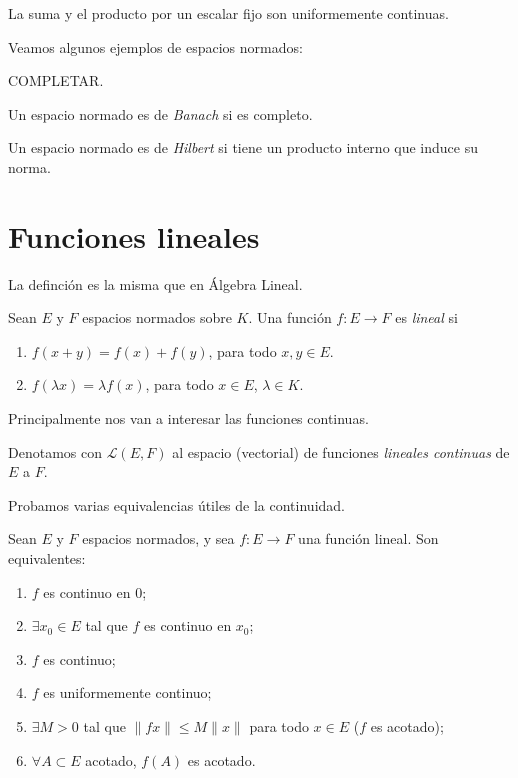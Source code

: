 \begin{remark}
	La suma y el producto por un escalar fijo son uniformemente continuas.
\end{remark}

Veamos algunos ejemplos de espacios normados:

\begin{example}
	\color{red} COMPLETAR.
\end{example}

\begin{definition}
	Un espacio normado es de \emph{Banach} si es completo.
\end{definition}

\begin{definition}
	Un espacio normado es de \emph{Hilbert} si tiene un producto interno que induce su norma.
\end{definition}


\section{Funciones lineales}

La definción es la misma que en Álgebra Lineal.

\begin{definition}
	Sean $E$ y $F$ espacios normados sobre $K$. Una función $f : E \to F$ es \emph{lineal} si
	\begin{enumerate}
		\item $f(x + y) = f(x) + f(y)$, para todo $x, y \in E$.
		\item $f(\lambda x) = \lambda f(x)$, para todo $x \in E$, $\lambda \in K$.
	\end{enumerate}
\end{definition}

Principalmente nos van a interesar las funciones continuas.

\begin{definition}
	Denotamos con $\mathcal{L}(E, F)$ al espacio (vectorial) de funciones \emph{lineales continuas} de $E$ a $F$.
\end{definition}

Probamos varias equivalencias útiles de la continuidad.

\begin{proposition}
	Sean $E$ y $F$ espacios normados, y sea $f : E \to F$ una función lineal. Son equivalentes:
	\begin{enumerate}
		\item $f$ es continuo en $0$;
		\item $\exists x_0 \in E$ tal que $f$ es continuo en $x_0$;
		\item $f$ es continuo;
		\item $f$ es uniformemente continuo;
		\item $\exists M > 0$ tal que $\|fx\| \le M\|x\|$ para todo $x \in E$ ($f$ es acotado);
		\item $\forall A \subset E$ acotado, $f(A)$ es acotado.
	\end{enumerate}
\end{proposition}

